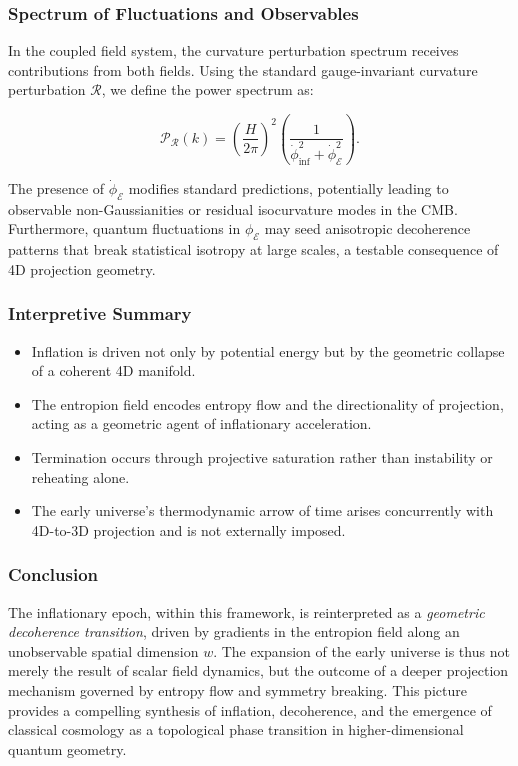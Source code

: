 \documentclass[12pt]{article}
\begin{document}
\subsubsection*{Spectrum of Fluctuations and Observables}

In the coupled field system, the curvature perturbation spectrum receives contributions from both fields. Using the standard gauge-invariant curvature perturbation \(\mathcal{R}\), we define the power spectrum as:

\begin{equation}
\label{eq:curvature_spectrum_coupled}
\mathcal{P}_{\mathcal{R}}(k) = \left( \frac{H}{2\pi} \right)^2 \left( \frac{1}{\dot{\phi}_{\text{inf}}^2 + \dot{\phi}_{\mathcal{E}}^2} \right).
\end{equation}

The presence of \(\dot{\phi}_{\mathcal{E}}\) modifies standard predictions, potentially leading to observable non-Gaussianities or residual isocurvature modes in the CMB. Furthermore, quantum fluctuations in \(\phi_{\mathcal{E}}\) may seed anisotropic decoherence patterns that break statistical isotropy at large scales, a testable consequence of 4D projection geometry.

\subsubsection*{Interpretive Summary}

\begin{itemize}
  \item Inflation is driven not only by potential energy but by the geometric collapse of a coherent 4D manifold.
  \item The entropion field encodes entropy flow and the directionality of projection, acting as a geometric agent of inflationary acceleration.
  \item Termination occurs through projective saturation rather than instability or reheating alone.
  \item The early universe's thermodynamic arrow of time arises concurrently with 4D-to-3D projection and is not externally imposed.
\end{itemize}

\subsubsection*{Conclusion}

The inflationary epoch, within this framework, is reinterpreted as a \emph{geometric decoherence transition}, driven by gradients in the entropion field along an unobservable spatial dimension \(w\). The expansion of the early universe is thus not merely the result of scalar field dynamics, but the outcome of a deeper projection mechanism governed by entropy flow and symmetry breaking. This picture provides a compelling synthesis of inflation, decoherence, and the emergence of classical cosmology as a topological phase transition in higher-dimensional quantum geometry.
\end{document}
